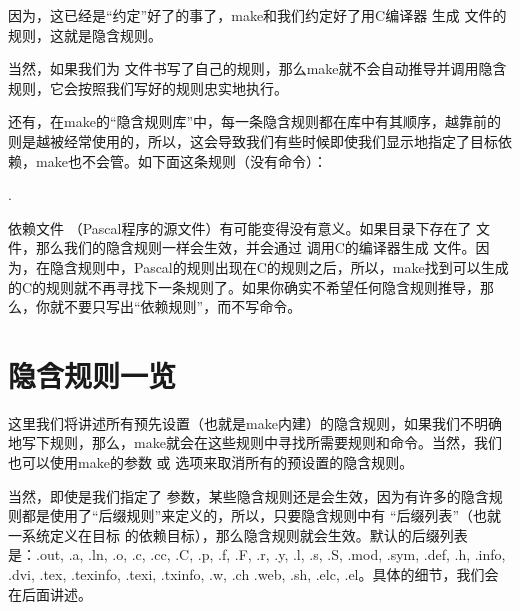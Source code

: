 \documentclass[a4paper,10pt]{sphinxmanual}
\begin{document}
因为，这已经是“约定”好了的事了，make和我们约定好了用C编译器  生成  文件的规则，这就是隐含规则。

当然，如果我们为  文件书写了自己的规则，那么make就不会自动推导并调用隐含规则，它会按照我们写好的规则忠实地执行。

还有，在make的“隐含规则库”中，每一条隐含规则都在库中有其顺序，越靠前的则是越被经常使用的，所以，这会导致我们有些时候即使我们显示地指定了目标依赖，make也不会管。如下面这条规则（没有命令）：

\begin{sphinxVerbatim}[commandchars=\\\{\}]
 .
\end{sphinxVerbatim}

依赖文件  （Pascal程序的源文件）有可能变得没有意义。如果目录下存在了  文件，那么我们的隐含规则一样会生效，并会通过  调用C的编译器生成  文件。因为，在隐含规则中，Pascal的规则出现在C的规则之后，所以，make找到可以生成  的C的规则就不再寻找下一条规则了。如果你确实不希望任何隐含规则推导，那么，你就不要只写出“依赖规则”，而不写命令。


\section{隐含规则一览}
\label{\detokenize{implicit_rules:id3}}
这里我们将讲述所有预先设置（也就是make内建）的隐含规则，如果我们不明确地写下规则，那么，make就会在这些规则中寻找所需要规则和命令。当然，我们也可以使用make的参数  或 
选项来取消所有的预设置的隐含规则。

当然，即使是我们指定了  参数，某些隐含规则还是会生效，因为有许多的隐含规则都是使用了“后缀规则”来定义的，所以，只要隐含规则中有 “后缀列表”（也就一系统定义在目标 
的依赖目标），那么隐含规则就会生效。默认的后缀列表是：.out, .a, .ln, .o,  .c, .cc, .C, .p, .f, .F, .r, .y, .l, .s, .S, .mod, .sym,
.def, .h, .info,  .dvi, .tex, .texinfo, .texi, .txinfo, .w, .ch .web, .sh, .elc, .el。具体的细节，我们会在后面讲述。
\end{document}
